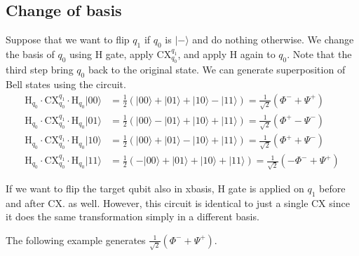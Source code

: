 \documentclass[letterpaper,10pt,english]{jupyterBook}
\begin{document}
\subsection{Change of basis}
\label{\detokenize{q2gates/cx:change-of-basis}}
\sphinxAtStartPar
Suppose that we want to flip \(q_1\)  if \(q_0\) is \(|-\rangle\) and do nothing otherwise.  We change the basis of \(q_0\) using H gate, apply CX\(_{q_0}^{q_1}\), and apply H again to \(q_0\).  Note that the third step bring \(q_0\) back to the original state.  We can generate superposition of Bell states using the circuit.
\begin{align}
\text{H}_{q_0} \cdot \text{CX}_{q_0}^{q_1} \cdot \text{H}_{q_0} |00\rangle &= \frac{1}{2}\left(|00\rangle + |01\rangle + |10\rangle - |11\rangle \right) = \frac{1}{\sqrt{2}} \left( \Phi^{-} + \Psi^{+} \right) \\
\text{H}_{q_0} \cdot \text{CX}_{q_0}^{q_1} \cdot \text{H}_{q_0} |01\rangle &= \frac{1}{2}\left(|00\rangle - |01\rangle + |10\rangle + |11\rangle \right) = \frac{1}{\sqrt{2}} \left( \Phi^{+} - \Psi^{-} \right) \\
\text{H}_{q_0} \cdot \text{CX}_{q_0}^{q_1} \cdot \text{H}_{q_0} |10\rangle &= \frac{1}{2}\left(|00\rangle + |01\rangle - |10\rangle + |11\rangle \right) = \frac{1}{\sqrt{2}} \left( \Phi^{+} + \Psi^{-} \right) \\
\text{H}_{q_0} \cdot \text{CX}_{q_0}^{q_1} \cdot \text{H}_{q_0} |11\rangle &= \frac{1}{2}\left(-|00\rangle + |01\rangle + |10\rangle + |11\rangle \right) = \frac{1}{\sqrt{2}} \left( -\Phi^{-} + \Psi^{+} \right)
\end{align}

\sphinxAtStartPar
If we want to flip the target qubit also in x\sphinxhyphen{}basis, H gate is applied on \(q_1\) before and after CX. as well.  However, this circuit is identical to just a single CX since it does the same transformation simply in a different basis.

\sphinxAtStartPar
The following example generates \(\frac{1}{\sqrt{2}} \left( \Phi^{-} + \Psi^{+} \right)\).
\end{document}
